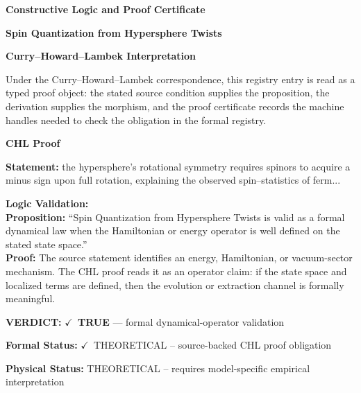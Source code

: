 \clearpage
\begingroup\tzpsupportsetup
\noindent\textbf{\fontsize{10.8pt}{12.8pt}\selectfont [ID 0198] Constructive Logic and Proof Certificate}\par
\noindent\textbf{\fontsize{10pt}{12pt}\selectfont Spin Quantization from Hypersphere Twists}\par
\vspace{0.45em}
\begingroup
\footnotesize
\setlength{\parskip}{0.22em}
\setlength{\parindent}{0pt}
\noindent\textbf{Curry--Howard--Lambek Interpretation}\par
Under the Curry--Howard--Lambek correspondence, this registry entry is read as a typed proof
object: the stated source condition supplies the proposition, the derivation supplies the
morphism, and the proof certificate records the machine handles needed to check the obligation
in the formal registry.

\vspace{0.45em}
\noindent\textbf{CHL Proof}\par
\textbf{Statement:} the hypersphere's rotational symmetry requires spinors to acquire a minus sign upon full
rotation, explaining the observed spin--statistics of ferm...

\textbf{Logic Validation:}\\
\textbf{Proposition:} ``Spin Quantization from Hypersphere Twists is valid as a formal dynamical law when the
Hamiltonian or energy operator is well defined on the stated state space.''\\
\textbf{Proof:} The source statement identifies an energy, Hamiltonian, or vacuum-sector mechanism. The
CHL proof reads it as an operator claim: if the state space and localized terms are
defined, then the evolution or extraction channel is formally meaningful.

\textbf{VERDICT:} \ensuremath{\checkmark}\ \textbf{TRUE} --- formal dynamical-operator validation

\textbf{Formal Status:} \ensuremath{\checkmark}\ THEORETICAL -- source-backed CHL proof obligation

\textbf{Physical Status:} THEORETICAL -- requires model-specific empirical interpretation
\par\vspace{0.45em}
\par
\ifTZPDarkEdition
{}
\fi
\endgroup
\endgroup
